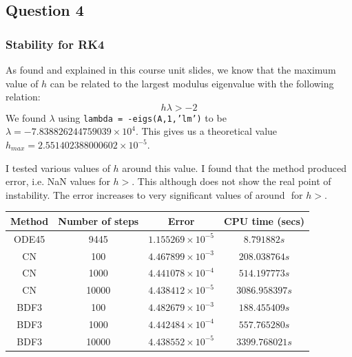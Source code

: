\documentclass[a4paper, 11pt]{article}
\begin{document}
	
	\subsection*{Question 4}
		\subsubsection*{Stability for RK4}
			As found and explained in this course unit slides, we know that the maximum value of $ h $ can be related to the largest modulus eigenvalue with the following relation:
			\begin{equation}
				h\lambda > -2
			\end{equation}
			We found $ \lambda $ using \texttt{lambda = -eigs(A,1,’lm’)} to be $ \lambda = -7.838826244759039\times 10^{4} $.
			This gives us a theoretical value $h_{max} = 2.551402388000602\times 10^{-5} $. 
			
			I tested various values of $h$ around this value. 
			I found that the method produced error, i.e. NaN values for $h> $.
			This although does not show the real point of instability.
			The error increases to very significant values of around $ $ for  $h> $.
			
			
			
	
	\begin{table}[H]
		\centering
		\begin{tabular}{c|c|c|c}
			\textbf{Method} & \textbf{Number of steps} 	& \textbf{Error}  				& \textbf{CPU time (secs)}  	\\ \hline
			ODE45 			& 9445 						& $ 1.155269\times 10^{-5} $ 	& $ 8.791882 s $ 	\\ \hline 
			CN 				& 100 						& $ 4.467899\times 10^{-3} $ 	& $ 208.038764 s $ 				\\ \hline
			CN 				& 1000 						& $ 4.441078\times 10^{-4} $ 	& $ 514.197773 s $ 				\\ \hline
			CN 				& 10000 					& $ 4.438412\times 10^{-5} $ 	& $ 3086.958397 s $				\\ \hline
			BDF3 			& 100				 		& $ 4.482679\times 10^{-3} $ 	& $ 188.455409 s $ 				\\ \hline
			BDF3 			& 1000						& $ 4.442484\times 10^{-4} $ 	& $ 557.765280 s $ 				\\ \hline
			BDF3 			& 10000 					& $ 4.438552\times 10^{-5} $ 	& $ 3399.768021 s $ 			\\ \hline
		\end{tabular}
	\end{table}
\end{document}
